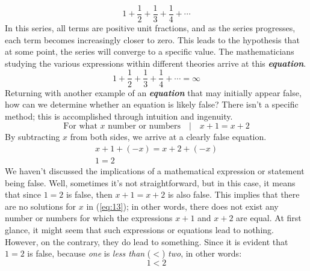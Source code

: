 \[
  1 + \frac{1}{2} + \frac{1}{3} + \frac{1}{4} + \cdots
\]
In this series, all terms are positive unit fractions, and as the series progresses, each term becomes increasingly closer to zero. This leads to the hypothesis that at some point, the series will converge to a specific value. The mathematicians studying the various expressions within different theories arrive at this \textbf{\textit{equation}}.
\[
  1 + \frac{1}{2} + \frac{1}{3} + \frac{1}{4} + \cdots = \infty
\]
Returning with another example of an \textbf{\textit{equation}} that may initially appear false, how can we determine whether an equation is likely false? There isn't a specific method; this is accomplished through intuition and ingenuity.
\begin{equation} \label{eq:13}
  \text{For what $x$ number or numbers}\quad | \quad x + 1 = x + 2
\end{equation}
By subtracting $x$ from both sides, we arrive at a clearly false equation.
\[
\begin{gathered}
  x + 1 + (-x) = x + 2 + (-x)\\
  1 = 2
\end{gathered}
\]
We haven't discussed the implications of a mathematical expression or statement being false. Well, sometimes it's not straightforward, but in this case, it means that since $1 = 2$ is false, then $x + 1 = x + 2$ is also false. This implies that there are no solutions for $x$ in (\ref{eq:13}); in other words, there does not exist any number or numbers for which the expressions $x + 1$ and $x + 2$ are equal.
At first glance, it might seem that such expressions or equations lead to nothing. However, on the contrary, they do lead to something. Since it is evident that $1 = 2$ is false, because \textit{one} is \textit{less than} ($<$) \textit{two}, in other words:
\begin{equation} \label{eq:14}
  1 < 2
\end{equation}

